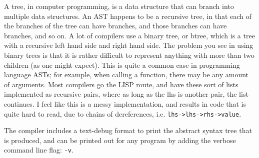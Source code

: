 \documentclass[12pt]{report}
\begin{document}
A tree, in computer programming, is a data structure that can branch into multiple data structures. An AST happens to be a recursive tree, in that each of the branches of the tree can have branches, and those branches can have branches, and so on. A lot of compilers use a binary tree, or btree, which is a tree with a recursive left hand side and right hand side. The problem you see in using binary trees is that it is rather difficult to represent anything with more than two children (as one might expect). This is quite a common case in programming language ASTs; for example, when calling a function, there may be any amount of arguments. Most compilers go the LISP route, and have these sort of lists implemented as recursive pairs, where as long as the lhs is another pair, the list continues. I feel like this is a messy implementation, and results in code that is quite hard to read, due to chains of dereferences, i.e. \verb|lhs->lhs->rhs->value|.

The compiler includes a text-debug format to print the abstract syntax tree that is produced, and can be printed out for any program by adding the verbose command line flag: \verb|-v|.
\end{document}
